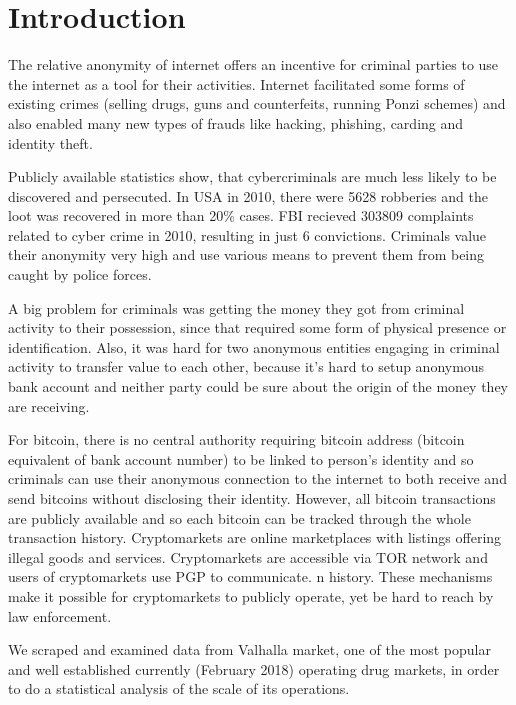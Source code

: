 \documentclass[
  digital, %
  table,   %
  lof,     %
  lot,     %
  oneside
]{fithesis3}
\begin{document}
\chapter{Introduction}

The relative anonymity of internet offers an incentive for criminal parties to use the internet as a tool for their activities.
Internet facilitated some forms of existing crimes (selling drugs, guns and
counterfeits, running Ponzi schemes) and also enabled many new types of frauds like hacking, phishing, carding and identity theft.

Publicly available statistics show, that cybercriminals are much
 less likely to be discovered and persecuted.
 In USA in 2010, there were 5628 robberies and the loot was recovered in more than 20\% cases. \parencite{fbi10} 
 FBI recieved 303809 complaints related to cyber crime in 2010, resulting in just 6 convictions. \parencite{fbcyber} 
Criminals value their anonymity very high and use various means to prevent them from being caught by police forces.
\parencite{tzanetakis2016transparency}
\parencite{van2013surfing}
\parencite{aldridge2014not}

A big problem for criminals was getting the money they got from criminal activity to their possession,
since that required some form of physical presence or identification.
Also, it was hard for two anonymous entities engaging in criminal activity to transfer value to each other,
 because it's hard to setup anonymous bank account and neither party could be sure about the origin of
 the money they are receiving.

For bitcoin, there is no central authority requiring bitcoin address
(bitcoin equivalent of bank account number) to be linked to person's identity and so 
criminals can use their anonymous connection to the internet to both receive and send bitcoins without disclosing their identity.
However, all bitcoin transactions are publicly available and so each bitcoin can be tracked through the whole transaction history.
 Cryptomarkets are online marketplaces with listings offering illegal goods and services.
 Cryptomarkets are accessible via TOR network and users of cryptomarkets use PGP to communicate. 
n history. These mechanisms make it possible for cryptomarkets to publicly operate, yet be hard to reach by law enforcement.
\parencite{cox2016staying}

We scraped and examined data from Valhalla market,
 one of the most popular and well established currently (February 2018) operating drug markets,
in order to do a statistical analysis of the scale of its operations.
\end{document}
